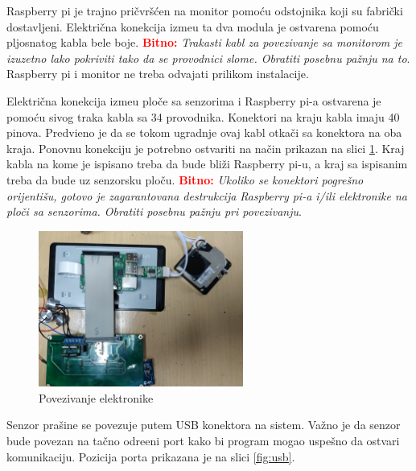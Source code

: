 \documentclass[a4paper]{article}
\def\bitno#1{\textbf{\textcolor{red}{Bitno:}} \textit{#1}}
\begin{document}
	Raspberry pi je trajno pri\v cvr\v s\' cen na monitor pomo\' cu odstojnika koji su fabri\v cki dostavljeni.
	Elektri\v cna konekcija izme\dj u ta dva modula je ostvarena pomo\' cu pljosnatog kabla bele boje. 
	\bitno{Trakasti kabl za povezivanje sa monitorom je izuzetno lako pokriviti tako da se provodnici slome.
	Obratiti posebnu pa\v znju na to}. Raspberry pi i monitor ne treba odvajati prilikom instalacije.
	
	Elektri\v cna konekcija izme\dj u plo\v ce sa senzorima i Raspberry pi-a ostvarena je pomo\' cu sivog
	traka kabla sa 34 provodnika. Konektori na kraju kabla imaju 40 pinova. Predvi\dj eno je da se tokom 
	ugradnje ovaj kabl otka\v ci sa konektora na oba kraja. Ponovnu konekciju je potrebno ostvariti na na\v cin
	prikazan na slici \ref{fig:overall}. Kraj kabla na kome je ispisano  treba da bude bli\v zi
	Raspberry pi-u, a kraj sa ispisanim  treba da bude uz senzorsku plo\v cu.
	 \bitno{Ukoliko se konektori pogre\v sno orijenti\v su, gotovo je 
	zagarantovana destrukcija Raspberry pi-a i/ili elektronike na plo\v ci sa senzorima. Obratiti
	posebnu pa\v znju pri povezivanju}.
	
	\begin{figure}[H]
		\centering
		\includegraphics[width=0.6\textwidth]{graphics/overall.jpg}
		\caption{Povezivanje elektronike}
		\label{fig:overall}
	\end{figure}
	
	Senzor pra\v sine se povezuje putem USB konektora na sistem. Va\v zno je da senzor bude povezan 
	na ta\v cno odre\dj eni port kako bi program mogao uspe\v sno da ostvari komunikaciju. Pozicija porta
	prikazana je na slici \ref{fig:usb}.
	
\end{document}
